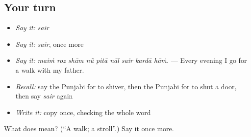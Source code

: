 \subsection*{Your turn}
\begin{itemize}
\raggedright
  \item \emph{Say it:} \emph{sair}
  \item \emph{Say it:} \emph{sair}, once more
  \item \emph{Say it:} \emph{maiṁ roz shām nū̃ pitā nāl sair kardā hāṁ.} — Every evening I go for a walk with my father.
  \item \emph{Recall:} say the Punjabi for to shiver, then the Punjabi for to shut a door, then say \emph{sair} again
  \item \emph{Write it:} copy \textbf{} once, checking the whole word
\end{itemize}

\begin{tcolorbox}[breakable,colback=teal!4,colframe=teal!35!black,title={Before you move on}]
What does  mean? (\textquotedblleft{}A walk; a stroll\textquotedblright{}.) Say it once more.
\end{tcolorbox}

